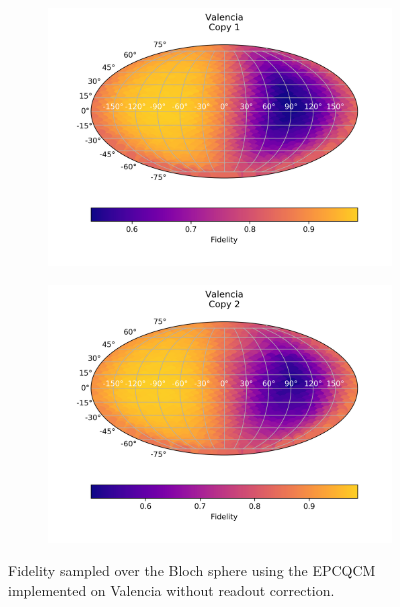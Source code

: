   \begin{figure}[H]
    \centering
    \begin{subfigure}{.5\textwidth}
      \centering
      \includegraphics[width=\textwidth]{Figures/Economical/IBM/FullSphere/results_valencia_copy1.png}
      \label{fig:epc_uncorrected_valencia_sphere_1}
    \end{subfigure}%
    \begin{subfigure}{.5\textwidth}
      \centering
      \includegraphics[width=\textwidth]{Figures/Economical/IBM/FullSphere/results_valencia_copy2.png}
      \label{fig:epc_uncorrected_valencia_sphere_2}
    \end{subfigure}
    \caption{Fidelity sampled over the Bloch sphere using the EPCQCM implemented on Valencia without readout correction.}
    \label{fig:epc_uncorrected_valencia_sphere}
  \end{figure}
  
